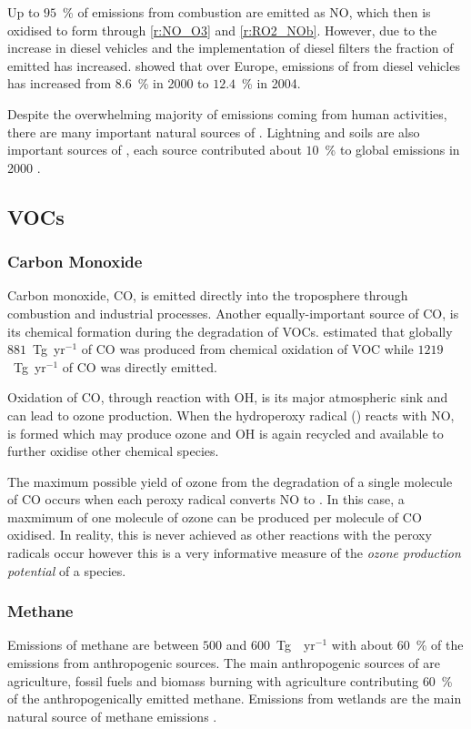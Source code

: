 Up to $95$~\% of  emissions from combustion are emitted as NO, which then is oxidised to form  through \eqref{r:NO_O3} and \eqref{r:RO2_NOb}.
However, due to the increase in diesel vehicles and the implementation of diesel filters the fraction of emitted  has increased.
\citet{Grice:2009} showed that over Europe, emissions of  from diesel vehicles has increased from $8.6$~\% in 2000 to $12.4$~\% in 2004.

Despite the overwhelming majority of  emissions coming from human activities, there are many important natural sources of .
Lightning and soils are also important sources of , each source contributed about $10$~\% to global  emissions in 2000 \citep{Seinfeld:2006}.

\subsection{VOCs}
\subsubsection{Carbon Monoxide}
Carbon monoxide, CO, is emitted directly into the troposphere through combustion and industrial processes.
Another equally-important source of CO, is its chemical formation during the degradation of VOCs.
\citet{Hauglustaine:1998} estimated that globally $881$~Tg~yr$^{-1}$ of CO was produced from chemical oxidation of VOC while $1219$~Tg~yr$^{-1}$ of CO was directly emitted.

Oxidation of CO, through reaction with OH, is its major atmospheric sink and can lead to ozone production.
When the hydroperoxy radical () reacts with NO,  is formed which may produce ozone and OH is again recycled and available to further oxidise other chemical species.

The maximum possible yield of ozone from the degradation of a single molecule of CO occurs when each peroxy radical converts NO to .
In this case, a maxmimum of one molecule of ozone can be produced per molecule of CO oxidised.
In reality, this is never achieved as other reactions with the peroxy radicals occur however this is a very informative measure of the \emph{ozone production potential} of a species.

\subsubsection{Methane}
Emissions of methane are between $500$ and $600$~Tg~~yr$^{-1}$ with about $60$~\% of the emissions from anthropogenic sources.
The main anthropogenic sources of  are agriculture, fossil fuels and biomass burning with agriculture contributing $60$~\% of the anthropogenically emitted methane.
Emissions from wetlands are the main natural source of methane emissions \citep{Kirschke:2013}.

